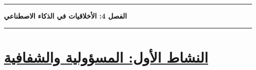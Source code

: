 \documentclass[a4paper]{article}
\begin{document}



\rule{\textwidth}{1pt}

\begin{center}

{\khatt\textbf{
الفصل 4: الأخلاقيات في الذكاء الاصطناعي
}}

\end{center}

\rule{\textwidth}{1pt}





\section*{\khatt\underline{النشاط الأول: المسؤولية والشفافية}}
\end{document}
